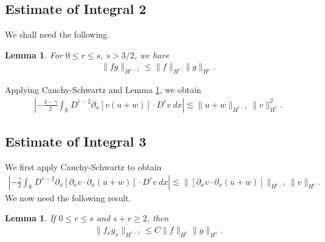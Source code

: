 \documentclass[12pt,reqno]{amsart}
\numberwithin{equation}{section}  %
\newcommand{\rr}{\mathbb{R}}
\newcommand{\p}{\partial}
\newtheorem{lemma}[theorem]{Lemma}
\begin{document}
\subsection{Estimate of Integral 2} We shall need the following.
%
%
%
%
%
%
%
%
\begin{lemma}
For $0 \le r \le s$, $s > 3/2$, we have
%
%
\begin{equation*}
\begin{split}
  \| fg \|_{H^{r-1}} \le \| f \|_{H^{r}} \| g \|_{H^{s}}.
\end{split}
\end{equation*}
%
%
\label{lem:frac-deriv}
\end{lemma}
%
%
%
%
%
%
Applying Cauchy-Schwartz and Lemma \ref{lem:frac-deriv}, we obtain
%
%
%
\begin{equation}
\begin{split}
\left | - \frac{3-\gamma}{2} \int_{\rr}  D^{r -2}
\p_x[v(u+w)] \cdot
D^r v \ dx  \right |
 \lesssim \|u+w\|_{H^{r -1}} \|v\|_{H^r}^2.
\label{3v}
\end{split}
\end{equation}
%
%
%

\subsection{Estimate of Integral 3} We first apply
Cauchy-Schwartz to obtain
%
%
\begin{equation*}
\begin{split}
\left | - \frac{\gamma}{2} \int_{\rr} D^{r 
-2} \p_x [ \p_x v
\cdot \p_x (u+w)]\cdot D^r v \ dx \right | 
 \lesssim 
\|[\p_x v \cdot \p_x (u+w)] \|_{H^{r -1}}
\|v\|_{H^r}.
\end{split}
\end{equation*}
%
We now need the following result.
%
%
%
\begin{lemma}
\label{impo}
If  $0 \le r \le s$ and $s + r \ge 2$,  then
%
%
\begin{equation}
\begin{split}
  \|f_{x}g_{x}\|_{H^{r - 1}} \le C \|f\|_{H^{r}}
\|g\|_{H^{s}}.
\label{11}
\end{split}
\end{equation}
%
%
\end{lemma}
\end{document}
